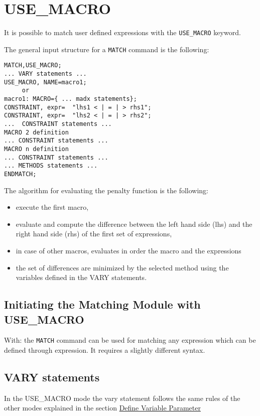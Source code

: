 %

\section{USE\_MACRO}
\label{sec:use_macro}
 
It is possible to match user defined expressions with the
{\tt USE\_MACRO} keyword. 

The general input structure for a {\tt MATCH} command is the following:

\begin{verbatim}
MATCH,USE_MACRO;
... VARY statements ...
USE_MACRO, NAME=macro1;
     or
macro1: MACRO={ ... madx statements};
CONSTRAINT, expr=  "lhs1 < | = | > rhs1";
CONSTRAINT, expr=  "lhs2 < | = | > rhs2";
...  CONSTRAINT statements ...
MACRO 2 definition
... CONSTRAINT statements ...
MACRO n definition
... CONSTRAINT statements ...
... METHODS statements ...
ENDMATCH;
\end{verbatim}
 
The algorithm for evaluating the penalty function is the following:
 
\begin{itemize}
   \item  execute the first macro,
   \item  evaluate and compute the difference between the left hand side
     (lhs) and the right hand side (rhs) of the first set of expressions, 
   \item in case of other macros, evaluates in order the macro and the
     expressions 
   \item  the set of differences are  minimized by the selected method
     using the variables defined in the VARY statements. 
\end{itemize}

\subsection{Initiating the Matching Module with USE\_MACRO}
 
With:
the {\tt MATCH} command can be used for matching any expression which can be
defined through expression. It requires a slightly different syntax.

\subsection{VARY statements}
In the USE\_MACRO mode the vary statement follows the same rules of the
other modes explained in the section \href{match_vary.html}{Define
  Variable Parameter} 

